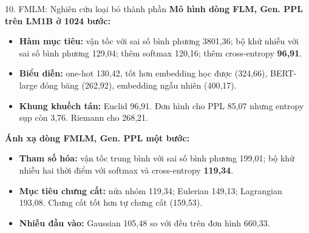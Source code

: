 \begin{frame}{10. FMLM: Nghiên cứu loại bỏ thành phần}
    \textbf{Mô hình dòng FLM, Gen. PPL trên LM1B ở 1024 bước:}
    \begin{itemize}
        \item \textbf{Hàm mục tiêu:} vận tốc với sai số bình phương 3801,36; bộ khử nhiễu với sai số bình phương 129,04; thêm softmax 120,16; thêm cross-entropy \textbf{96,91}.
        \item \textbf{Biểu diễn:} one-hot 130,42, tốt hơn embedding học được (324,66), BERT-large đóng băng (262,92), embedding ngẫu nhiên (400,17).
        \item \textbf{Khung khuếch tán:} Euclid 96,91. Đơn hình cho PPL 85,07 nhưng entropy sụp còn 3,76. Riemann cho 268,21.
    \end{itemize}
    \vspace{0.1cm}
    \textbf{Ánh xạ dòng FMLM, Gen. PPL một bước:}
    \begin{itemize}
        \item \textbf{Tham số hóa:} vận tốc trung bình với sai số bình phương 199,01; bộ khử nhiễu hai thời điểm với softmax và cross-entropy \textbf{119,34}.
        \item \textbf{Mục tiêu chưng cất:} nửa nhóm 119,34; Eulerian 149,13; Lagrangian 193,08. Chưng cất tốt hơn tự chưng cất (159,53).
        \item \textbf{Nhiễu đầu vào:} Gaussian 105,48 so với đều trên đơn hình 660,33.
    \end{itemize}
\end{frame}

